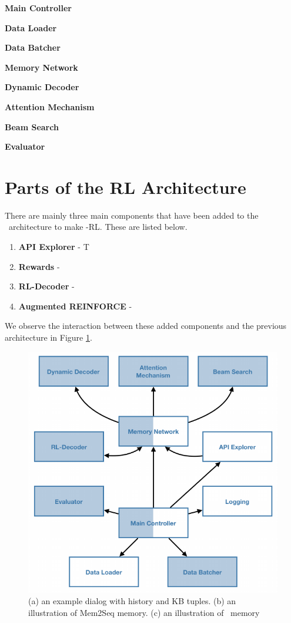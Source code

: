 \noindent\textbf{Main Controller}

\noindent\textbf{Data Loader}

\noindent\textbf{Data Batcher}

\noindent\textbf{Memory Network}

\noindent\textbf{Dynamic Decoder}

\noindent\textbf{Attention Mechanism}

\noindent\textbf{Beam Search}

\noindent\textbf{Evaluator}

\section{Parts of the \sys\-RL Architecture}

There are mainly three main components that have been added to the \sys\ architecture to make \sys -RL. These are listed below.

\begin{enumerate}
	\item \textbf{API Explorer} - T
	\item \textbf{Rewards} - 
	\item \textbf{RL-Decoder} - 
	\item \textbf{Augmented REINFORCE} - 
\end{enumerate}

We observe the interaction between these added components and the previous architecture in Figure \ref{fig:sys_comp_rl}.

\begin{figure}[t]
\centering
\includegraphics[scale=1.0]{assets/figures/components_rl.pdf}
\caption{(a) an example dialog with history and KB tuples. (b) an illustration of Mem2Seq memory. (c) an illustration of \sys\ memory}
\label{fig:sys_comp_rl}
\end{figure}

